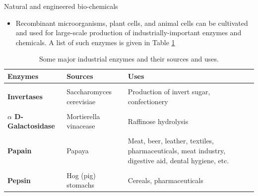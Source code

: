 \documentclass[
  ignorenonframetext,
  aspectratio=169]{beamer}
\providecommand{\tightlist}{%
  \setlength{\itemsep}{0pt}\setlength{\parskip}{0pt}}
\begin{document}
\begin{frame}{Natural and engineered bio-chemicals}
\protect\hypertarget{natural-and-engineered-bio-chemicals}{}
\begin{itemize}
\tightlist
\item
  Recombinant microorganisms, plant cells, and animal cells can be
  cultivated and used for large-scale production of
  industrially-important enzymes and chemicals. A list of such enzymes
  is given in Table \ref{tab:industrial-chemicals}
\end{itemize}

\begin{table}

\caption{\label{tab:industrial-chemicals}Some major industrial enzymes and their sources and uses.}
\centering
\fontsize{5}{7}\selectfont
\begin{tabular}[t]{>{\raggedright\arraybackslash}p{8em}>{\raggedright\arraybackslash}p{26em}>{\raggedright\arraybackslash}p{30em}}
\toprule
Enzymes & Sources & Uses\\
\midrule
\textbf{\cellcolor{gray!6}{Amylases}} & \cellcolor{gray!6}{Aspergillus niger, A. oryzae, B. licheniformis, B. subtilis, germinating cereals germinating barley} & \cellcolor{gray!6}{Hydrolyze starch to glucose, detergents, baked goods, milk cheese, fruit juice, digestive medicines, dental care}\\
\textbf{Invertases} & Saccharomyces cerevisiae & Production of invert sugar, confectionery\\
\textbf{\cellcolor{gray!6}{Glucose isomerase}} & \cellcolor{gray!6}{Arthrobacter globiformis, Actomoplanes missouriensis, Streptomyces solivaceus and E. coli} & \cellcolor{gray!6}{Conversion of glucose to fructose production of high fructose syrup, other beverages, and food}\\
\textbf{$\alpha$ D-Galactosidase} & Mortierella vinacease & Raffinose hydrolysis\\
\textbf{\cellcolor{gray!6}{$\beta$ D-Galactosidase}} & \cellcolor{gray!6}{Aspergillus niger} & \cellcolor{gray!6}{Lactose hydrolysis}\\
\addlinespace
\textbf{Papain} & Papaya & Meat, beer, leather, textiles, pharmaceuticals, meat industry, digestive aid, dental hygiene, etc.\\
\textbf{\cellcolor{gray!6}{Proteases}} & \cellcolor{gray!6}{Bacillus subtilis, B. licheniformis} & \cellcolor{gray!6}{Detergents, meat tenderizers, beer, cheese, flavor production}\\
\textbf{Pepsin} & Hog (pig) stomachs & Cereals, pharmaceuticals\\

\end{tabular}
\end{table}
\end{frame}
\end{document}
